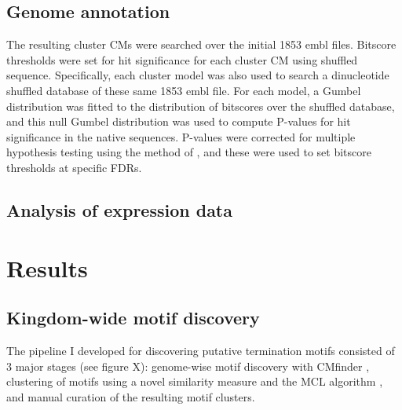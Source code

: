 \subsection{Genome annotation}

The resulting cluster CMs were searched over the initial 1853 embl files. Bitscore thresholds were set for hit significance for each cluster CM using shuffled sequence. Specifically, each cluster model was also used to search a dinucleotide shuffled database of these same 1853 embl file. For each model, a Gumbel distribution was fitted to the distribution of bitscores over the shuffled database, and this null Gumbel distribution was used to compute P-values for hit significance in the native sequences. P-values were corrected for multiple hypothesis testing using the method of \textcite{Benjamini1995}, and these were used to set bitscore thresholds at specific FDRs.

\subsection{Analysis of expression data}

\section{Results}

\subsection{Kingdom-wide motif discovery}

The pipeline I developed for discovering putative termination motifs consisted of 3 major stages (see figure X): genome-wise motif discovery with CMfinder  \parencite{Yao2006}, clustering of motifs using a novel similarity measure and the MCL algorithm \parencite{Enright2002}, and manual curation of the resulting motif clusters.  

